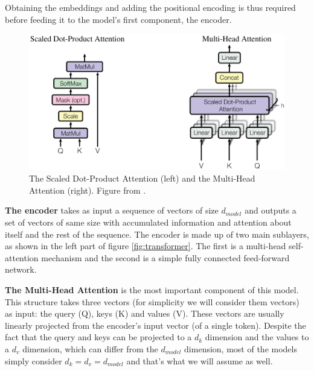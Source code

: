 \documentclass{report}[12pt, a4paper]
\begin{document}
Obtaining the embeddings and adding the positional encoding is thus required before feeding it to the model's first component, the encoder.

\begin{figure}[htp]
    \centering
    \includegraphics[width=13cm]{transformer_mha}
    \caption{ The Scaled Dot-Product Attention (left) and the Multi-Head Attention (right). Figure from \cite{attention_is_all_you_need}.}
    \label{fig:transformer_mha}
\end{figure}

\textbf{The encoder} takes as input a sequence of vectors of size $d_{model}$ and outputs a set of vectors of same size with accumulated information and attention about itself and the rest of the sequence. The encoder is made up of two main sublayers, as shown in the left part of figure \ref{fig:transformer}. The first is a multi-head self-attention mechanism and the second is a simple fully connected feed-forward network.

\textbf{The Multi-Head Attention} is the most important component of this model. This structure takes three vectors (for simplicity we will consider them vectors) as input: the query (Q), keys (K) and values (V). These vectors are usually linearly projected from the encoder's input vector (of a single token). Despite the fact that the query and keys can be projected to a $d_k$ dimension and the values to a $d_v$ dimension, which can differ from the $d_{model}$ dimension, most of the models simply consider $d_k = d_v = d_{model}$ and that's what we will assume as well.
\end{document}
